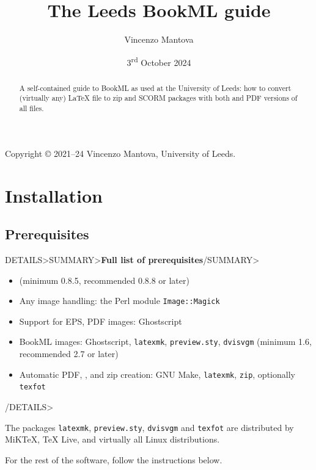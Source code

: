 \documentclass[a4paper,british]{article}
\title{The Leeds BookML guide}
\author{Vincenzo Mantova}
\date{3\textsuperscript{rd} October 2024}
\newenvironment{foldedframe}[1][]{%
    \<DETAILS>\<SUMMARY>\textbf{#1}\</SUMMARY>}%
  {\</DETAILS>}
\newenvironment{foldedframe}[1][]{\bgroup\colorlet{TFFrameColor}{SpringGreen}
  \colorlet{TFTitleColor}{black}\begin{titled-frame}{#1}}{\end{titled-frame}\egroup}
\begin{document}
\begin{lxFooter}
  Copyright \copyright{} 2021--24 Vincenzo Mantova, University of Leeds.
\end{lxFooter}
\fancyfoot[C]{}
\fancyfoot[R]{\thepage}
\pagestyle{fancy}

\maketitle

\begin{abstract}
  A self-contained guide to BookML as used at the University of Leeds: how to convert (virtually any) \LaTeX{} file to zip and SCORM packages with both \HTML{} and PDF versions of all files.
\end{abstract}


\tableofcontents

\section{Installation}
\subsection{Prerequisites}

\begin{foldedframe}[Full list of prerequisites]
  \begin{itemize}
    \item \LaTeXML{} (minimum 0.8.5, recommended 0.8.8 or later)
    \item Any image handling: the Perl module \texttt{Image::Magick}
    \item Support for EPS, PDF images: Ghostscript
    \item BookML images: Ghostscript, \texttt{latexmk}, \texttt{preview.sty}, \texttt{dvisvgm} (minimum 1.6, recommended 2.7 or later)
    \item Automatic PDF, \HTML, and zip creation: GNU Make, \texttt{latexmk}, \texttt{zip}, optionally \texttt{texfot}
  \end{itemize}
\end{foldedframe}

The packages \texttt{latexmk}, \texttt{preview.sty}, \texttt{dvisvgm} and \texttt{texfot} are distributed by MiK\TeX{}, \TeX{} Live, and virtually all Linux distributions.

For the rest of the software, follow the instructions below.
\end{document}

